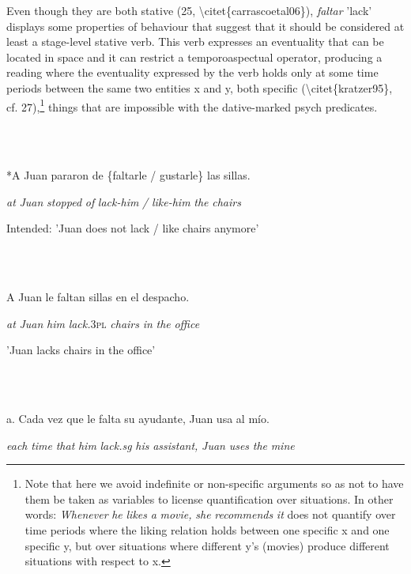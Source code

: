 \documentclass[output=paper,modfonts,nonflat]{langsci/langscibook}
\begin{document}
Even though they are both stative (25, {\textbackslash}citet\{carrascoetal06\}), \textit{faltar} {}'lack' displays some properties of behaviour that suggest that it should be considered at least a stage-level stative verb. This verb expresses an eventuality that can be located in space  and it can restrict a temporoaspectual operator, producing a reading where the eventuality expressed by the verb holds only at some time periods between the same two entities x and y, both specific ({\textbackslash}citet\{kratzer95\}, cf. 27),\footnote{Note that here we avoid indefinite or non-specific arguments so as not to have them be taken as variables to license quantification over situations. In other words: \textit{Whenever} \textit{he} \textit{likes} \textit{a} \textit{movie,} \textit{she} \textit{recommends} \textit{it} does not quantify over time periods where the liking relation holds between one specific x and one specific y, but over situations where different y's (movies) produce different situations with respect to x.} things that are impossible with the dative-marked psych predicates.

\ea%
    \label{ex:key:25}
    \gll\\
        \\
    \glt
    \z

        *A Juan  pararon de \{faltarle / gustarle\} las  sillas.  

          \textit{at} \textit{Juan} \textit{stopped} \textit{of}   \textit{lack-him} \textit{/} \textit{like-him} \textit{the} \textit{chairs}

    Intended: 'Juan does not lack / like chairs anymore'

\ea%
    \label{ex:key:26}
    \gll\\
        \\
    \glt
    \z

          A Juan le    faltan   sillas   en el  despacho.

    \textit{at} \textit{Juan} \textit{him} \textit{lack.}\textsc{3pl}  \textit{chairs} \textit{in} \textit{the} \textit{office}

    {}'Juan lacks chairs in the office'

\ea%
    \label{ex:key:27}
    \gll\\
        \\
    \glt
    \z

          a. Cada vez que le   falta   su ayudante,   Juan  usa al mío.

       \textit{each} \textit{time} \textit{that} \textit{him} \textit{lack.sg} \textit{his} \textit{assistant,} \textit{Juan} \textit{uses} \textit{the} \textit{mine}
\end{document}

